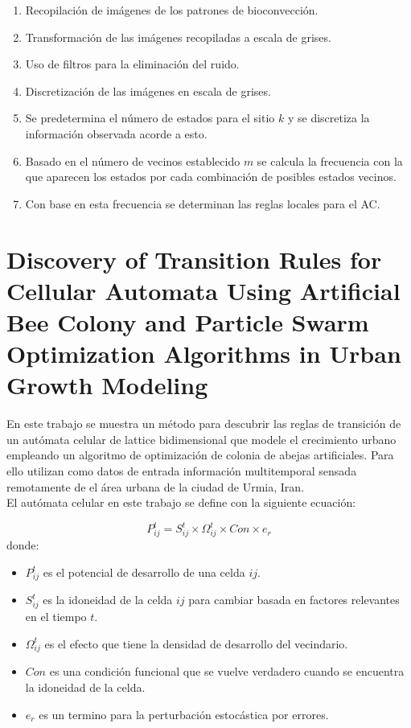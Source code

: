 \begin{enumerate}
	\item Recopilación de imágenes de los patrones de bioconvección.
	\item Transformación de las imágenes recopiladas a escala de grises.
	\item Uso de filtros para la eliminación del ruido.
	\item Discretización de las imágenes en escala de grises.
	\item Se predetermina el número de estados para el sitio $k$ y se discretiza la información observada acorde a esto.
	\item Basado en el número de vecinos establecido $m$ se calcula la frecuencia con la que aparecen los estados por cada combinación de posibles estados vecinos.
	\item Con base en esta frecuencia se determinan las reglas locales para el AC.
\end{enumerate}

\section{Discovery of Transition Rules for Cellular Automata Using Artificial Bee Colony and Particle Swarm Optimization Algorithms in Urban Growth Modeling}

En este trabajo \citep{naghibi2016discovery} se muestra un método para descubrir las reglas de transición de un autómata celular de lattice bidimensional que modele el crecimiento urbano empleando un algoritmo de optimización de colonia de abejas artificiales. Para ello utilizan como datos de entrada información multitemporal sensada remotamente de el área urbana de la ciudad de Urmia, Iran.
\\
El autómata celular en este trabajo se define con la siguiente ecuación:

\begin{equation} \label{eq:8}
P^t_{ij} = S^t_{ij}\times\Omega^t_{ij}\times Con\times e_r
\end{equation}
donde:
\begin{itemize}
	\item $P^t_{ij} $ es el potencial de desarrollo de una celda $ij$.
	\item $S^t_{ij}$ es la idoneidad de la celda $ij$ para cambiar basada en factores relevantes en el tiempo $t$.
	\item $\Omega^t_{ij}$ es el efecto que tiene la densidad de desarrollo del vecindario.
	\item $Con$ es una condición funcional que se vuelve verdadero cuando se encuentra la idoneidad de la celda.
	\item $e_r$ es un termino para la perturbación estocástica por errores.
\end{itemize}

